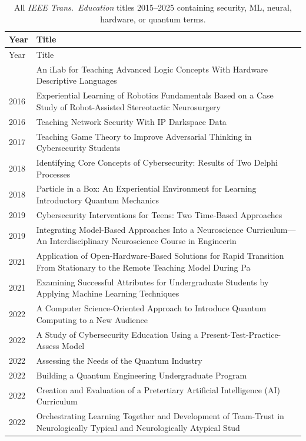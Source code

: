 \documentclass[10pt]{article}
\begin{document}
\begin{longtable}{@{}lL{14cm}@{}}
\caption{All \emph{IEEE Trans.\ Education} titles 2015--2025 containing security, ML, neural, hardware, or quantum terms.}\label{tab:S8}\\
\toprule
Year & Title \\
\midrule
\endfirsthead
\toprule
Year & Title \\
\midrule
\endhead
\bottomrule
{} & An iLab for Teaching Advanced Logic Concepts With Hardware Descriptive Languages \\
2016 & Experiential Learning of Robotics Fundamentals Based on a Case Study of Robot-Assisted Stereotactic Neurosurgery \\
2016 & Teaching Network Security With IP Darkspace Data \\
2017 & Teaching Game Theory to Improve Adversarial Thinking in Cybersecurity Students \\
2018 & Identifying Core Concepts of Cybersecurity: Results of Two Delphi Processes \\
2018 & Particle in a Box: An Experiential Environment for Learning Introductory Quantum Mechanics \\
2019 & Cybersecurity Interventions for Teens: Two Time-Based Approaches \\
2019 & Integrating Model-Based Approaches Into a Neuroscience Curriculum—An Interdisciplinary Neuroscience Course in Engineerin \\
2021 & Application of Open-Hardware-Based Solutions for Rapid Transition From Stationary to the Remote Teaching Model During Pa \\
2021 & Examining Successful Attributes for Undergraduate Students by Applying Machine Learning Techniques \\
2022 & A Computer Science-Oriented Approach to Introduce Quantum Computing to a New Audience \\
2022 & A Study of Cybersecurity Education Using a Present-Test-Practice-Assess Model \\
2022 & Assessing the Needs of the Quantum Industry \\
2022 & Building a Quantum Engineering Undergraduate Program \\
2022 & Creation and Evaluation of a Pretertiary Artificial Intelligence (AI) Curriculum \\
2022 & Orchestrating Learning Together and Development of Team-Trust in Neurologically Typical and Neurologically Atypical Stud \\

\end{longtable}
\end{document}
